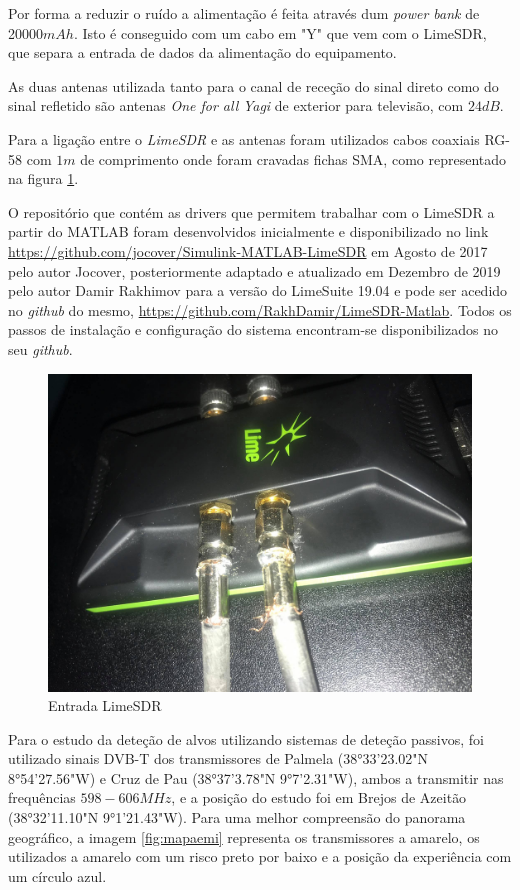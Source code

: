 Por forma a reduzir o ruído a alimentação é feita através dum \textit{power bank} de 20000$mAh$. Isto é conseguido com um cabo em "Y" que vem com o LimeSDR, que separa a entrada de dados da alimentação do equipamento.\par 
As duas antenas utilizada tanto para o canal de receção do sinal direto como do sinal refletido são antenas \textit{One for all} \textit{Yagi} de exterior para televisão, com $24dB$.\par 
Para a ligação entre o \textit{LimeSDR} e as antenas foram utilizados cabos coaxiais RG-58 com $1m$ de comprimento onde foram cravadas fichas SMA, como representado na figura \ref{fig:limec}.\par 
O repositório que contém as drivers que permitem trabalhar com o LimeSDR a partir do MATLAB foram desenvolvidos inicialmente e disponibilizado no link \url{https://github.com/jocover/Simulink-MATLAB-LimeSDR} em Agosto de 2017 pelo autor Jocover, posteriormente adaptado e atualizado em Dezembro de 2019 pelo autor Damir Rakhimov para a versão do LimeSuite 19.04 e pode ser acedido no \textit{github} do mesmo, \url{https://github.com/RakhDamir/LimeSDR-Matlab}. Todos os passos de instalação e configuração do sistema encontram-se disponibilizados no seu \textit{github}.

\begin{figure}[h]
\centering
\includegraphics[scale=0.15]{chapters/ch5/assets/limec}
\caption[Entrada LimeSDR]{Entrada LimeSDR}
\label{fig:limec}
\end{figure}

Para o estudo da deteção de alvos utilizando sistemas de deteção passivos, foi utilizado sinais \gls{DVB-T} dos transmissores de Palmela (38°33'23.02"N	8°54'27.56"W) e Cruz de Pau (38°37'3.78"N	9°7'2.31"W), ambos a transmitir nas frequências $598-606 MHz$, e a posição do estudo foi em Brejos de Azeitão (38°32'11.10"N	9°1'21.43"W). Para uma melhor compreensão do panorama geográfico, a imagem \ref{fig:mapaemi} representa os transmissores a amarelo,  os utilizados a amarelo com um risco preto por baixo e a posição da experiência com um círculo azul.


